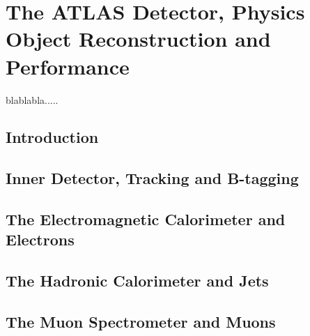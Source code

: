 \chapter{The ATLAS Detector, Physics Object Reconstruction and Performance}\label{chap:detector}


blablabla..... 
\clearpage


\section{Introduction}

\section{Inner Detector, Tracking and B-tagging}

\section{The Electromagnetic Calorimeter and Electrons}

\section{The Hadronic Calorimeter and Jets}

\section{The Muon Spectrometer and Muons}

